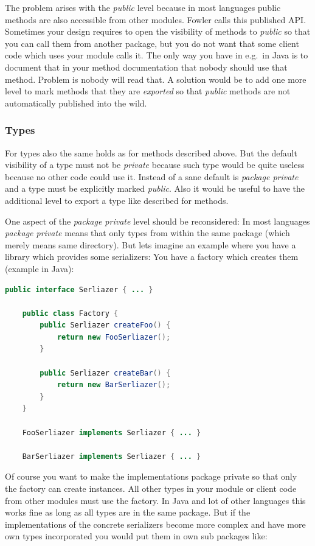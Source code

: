 \documentclass[11pt, a4paper]{report}
\begin{document}
The problem arises with the \textit{public} level because in most languages public methods are also accessible from other modules. Fowler calls this published API. Sometimes your design requires to open the visibility of methods to \textit{public} so that you can call them from another package, but you do not want that some client code which uses your module calls it. The only way you have in e.g.\ in Java is to document that in your method documentation that nobody should use that method. Problem is nobody will read that. A solution would be to add one more level to mark methods that they are \textit{exported} so that \textit{public} methods are not automatically published into the wild.

\subsubsection{Types}

For types also the same holds as for methods described above. But the default visibility of a type must not be \textit{private} because such type would be quite useless because no other code could use it. Instead of a sane default is \textit{package private} and a type must be explicitly marked \textit{public}. Also it would be useful to have the additional level to export a type like described for methods.

One aspect of the \textit{package private} level should be reconsidered: In most languages \textit{package private} means that only types from within the same package (which merely means same directory). But lets imagine an example where you have a library which provides some serializers: You have a factory which creates them (example in Java):

\begin{lstlisting}[language=Java]
    public interface Serliazer { ... }
    
    public class Factory {
        public Serliazer createFoo() { 
            return new FooSerliazer();
        }
        
        public Serliazer createBar() { 
            return new BarSerliazer();
        }
    }    
    
    FooSerliazer implements Serliazer { ... }

    BarSerliazer implements Serliazer { ... }
\end{lstlisting}

Of course you want to make the implementations package private so that only the factory can create instances. All other types in your module or client code from other modules must use the factory. In Java and lot of other languages this works fine as long as all types are in the same package. But if the implementations of the concrete serializers become more complex and have more own types incorporated you would put them in own sub packages like:
\\
\end{document}
